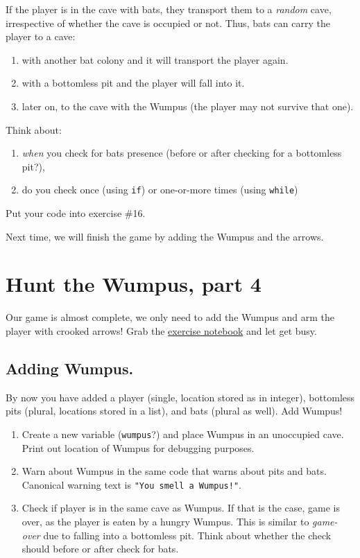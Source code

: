 \documentclass[
]{book}
\providecommand{\tightlist}{%
  \setlength{\itemsep}{0pt}\setlength{\parskip}{0pt}}
\begin{document}
If the player is in the cave with bats, they transport them to a \emph{random} cave, irrespective of whether the cave is occupied or not. Thus, bats can carry the player to a cave:

\begin{enumerate}
\def\labelenumi{\arabic{enumi}.}
\tightlist
\item
  with another bat colony and it will transport the player again.
\item
  with a bottomless pit and the player will fall into it.
\item
  later on, to the cave with the Wumpus (the player may not survive that one).
\end{enumerate}

Think about:

\begin{enumerate}
\def\labelenumi{\arabic{enumi}.}
\tightlist
\item
  \emph{when} you check for bats presence (before or after checking for a bottomless pit?),
\item
  do you check once (using \texttt{if}) or one-or-more times (using \texttt{while})
\end{enumerate}

Put your code into exercise \#16.

Next time, we will finish the game by adding the Wumpus and the arrows.

\hypertarget{seminar07}{%
\chapter{Hunt the Wumpus, part 4}\label{seminar07}}

Our game is almost complete, we only need to add the Wumpus and arm the player with crooked arrows! Grab the \href{notebooks/Seminar\%2007.\%20Hunt\%20the\%20Wumpus,\%20part\%204.ipynb}{exercise notebook} and let get busy.

\hypertarget{adding-wumpus.}{%
\section{Adding Wumpus.}\label{adding-wumpus.}}

By now you have added a player (single, location stored as in integer), bottomless pits (plural, locations stored in a list), and bats (plural as well). Add Wumpus!

\begin{enumerate}
\def\labelenumi{\arabic{enumi}.}
\tightlist
\item
  Create a new variable (\texttt{wumpus}?) and place Wumpus in an unoccupied cave. Print out location of Wumpus for debugging purposes.
\item
  Warn about Wumpus in the same code that warns about pits and bats. Canonical warning text is \texttt{"You\ smell\ a\ Wumpus!"}.
\item
  Check if player is in the same cave as Wumpus. If that is the case, game is over, as the player is eaten by a hungry Wumpus. This is similar to \emph{game-over} due to falling into a bottomless pit. Think about whether the check should before or after check for bats.
\end{enumerate}
\end{document}
